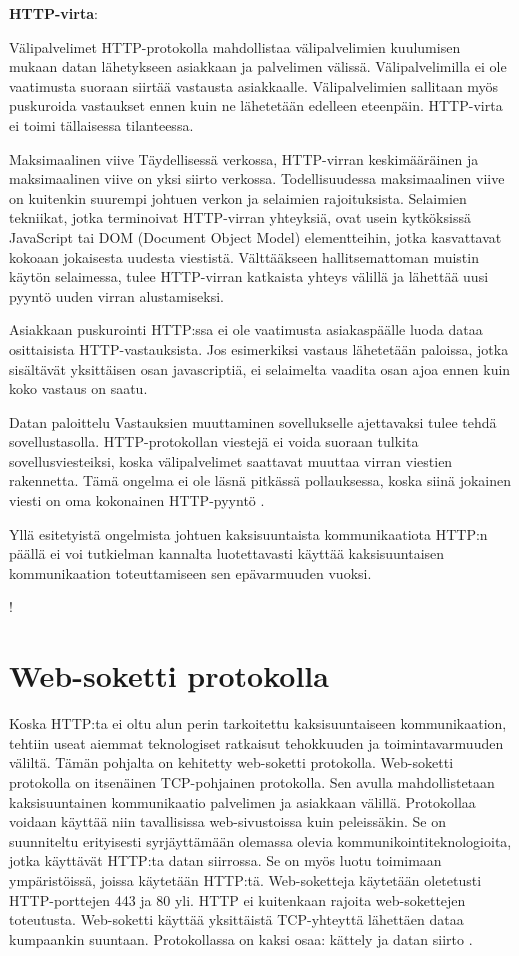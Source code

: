 \documentclass[utf8]{gradu3}
\begin{document}
\textbf{HTTP-virta}:
\begin{desclist}
\item[Välipalvelimet] HTTP-protokolla mahdollistaa välipalvelimien kuulumisen mukaan datan lähetykseen asiakkaan ja palvelimen välissä. Välipalvelimilla ei ole vaatimusta suoraan siirtää vastausta asiakkaalle. Välipalvelimien sallitaan myös puskuroida vastaukset ennen kuin ne lähetetään edelleen eteenpäin. HTTP-virta ei toimi tällaisessa tilanteessa.
\item[Maksimaalinen viive] Täydellisessä verkossa, HTTP-virran keskimääräinen ja maksimaalinen viive on yksi siirto verkossa. Todellisuudessa maksimaalinen viive on kuitenkin suurempi johtuen verkon ja selaimien rajoituksista. Selaimien tekniikat, jotka terminoivat HTTP-virran yhteyksiä, ovat usein kytköksissä JavaScript tai DOM (Document Object Model) elementteihin, jotka kasvattavat kokoaan jokaisesta uudesta viestistä. Välttääkseen hallitsemattoman muistin käytön selaimessa, tulee HTTP-virran katkaista yhteys välillä ja lähettää uusi pyyntö uuden virran alustamiseksi.
\item[Asiakkaan puskurointi] HTTP:ssa ei ole vaatimusta asiakaspäälle luoda dataa osittaisista HTTP-vastauksista. Jos esimerkiksi vastaus lähetetään paloissa, jotka sisältävät yksittäisen osan javascriptiä, ei selaimelta vaadita osan ajoa ennen kuin koko vastaus on saatu.
\item[Datan paloittelu] Vastauksien muuttaminen sovellukselle ajettavaksi tulee tehdä sovellustasolla. HTTP-protokollan viestejä ei voida suoraan tulkita sovellusviesteiksi, koska välipalvelimet saattavat muuttaa virran viestien rakennetta. Tämä ongelma ei ole läsnä pitkässä pollauksessa, koska siinä jokainen viesti on oma kokonainen HTTP-pyyntö \parencite[s. 2]{long_polling}. 
\end{desclist}

Yllä esitetyistä ongelmista johtuen kaksisuuntaista kommunikaatiota HTTP:n päällä ei voi tutkielman kannalta luotettavasti käyttää kaksisuuntaisen kommunikaation toteuttamiseen sen epävarmuuden vuoksi.

!
\section{Web-soketti protokolla}
Koska HTTP:ta ei oltu alun perin tarkoitettu kaksisuuntaiseen kommunikaation, tehtiin useat aiemmat teknologiset ratkaisut tehokkuuden ja toimintavarmuuden väliltä. Tämän pohjalta on kehitetty web-soketti protokolla. Web-soketti protokolla on itsenäinen TCP-pohjainen protokolla. Sen avulla mahdollistetaan kaksisuuntainen kommunikaatio palvelimen ja asiakkaan välillä. Protokollaa voidaan käyttää niin tavallisissa web-sivustoissa kuin peleissäkin. Se on suunniteltu erityisesti syrjäyttämään olemassa olevia kommunikointiteknologioita, jotka käyttävät HTTP:ta datan siirrossa. Se on myös luotu toimimaan ympäristöissä, joissa käytetään HTTP:tä. Web-soketteja käytetään oletetusti HTTP-porttejen 443 ja 80 yli. HTTP ei kuitenkaan rajoita web-sokettejen toteutusta. Web-soketti käyttää yksittäistä TCP-yhteyttä lähettäen dataa kumpaankin suuntaan. Protokollassa on kaksi osaa: kättely ja datan siirto \parencite[s. 1.1]{websocket}.
\end{document}
